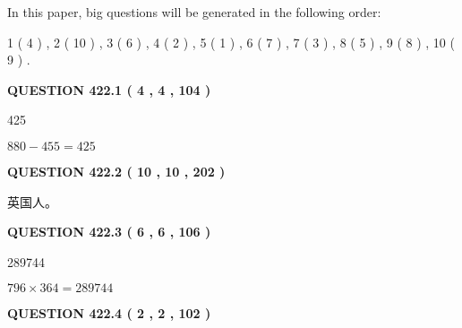 \documentclass{ctexart}
\begin{document}
In this paper, big questions will be generated in the following order: 
   
   
   1 ( 4 )
 ,
   2 ( 10 )
 ,
   3 ( 6 )
 ,
   4 ( 2 )
 ,
   5 ( 1 )
 ,
   6 ( 7 )
 ,
   7 ( 3 )
 ,
   8 ( 5 )
 ,
   9 ( 8 )
 ,
   10 ( 9 )
 .
  
\vspace{0.2in}
  
{\textbf{\Large{QUESTION
422.1 
 ( 4 , 4 , 104 )
}}}
  
  
 
 
\noindent{}

425
 
 
 
 
\noindent{}

$ %
880 -  %
455=   %
425$
 
 
  
\vspace{0.2in}
  
{\textbf{\Large{QUESTION
422.2 
 ( 10 , 10 , 202 )
}}}
  
  
 
 
\noindent{}
 
 
英国人。
 
 
 
 
  
\vspace{0.2in}
  
{\textbf{\Large{QUESTION
422.3 
 ( 6 , 6 , 106 )
}}}
  
  
 
 
\noindent{}

289744
 
 
 
 
\noindent{}

$ %
796 \times  %
364=   %
289744$
 
 
  
\vspace{0.2in}
  
{\textbf{\Large{QUESTION
422.4 
 ( 2 , 2 , 102 )
}}}
  
  
 
 
\noindent{}
\end{document}
